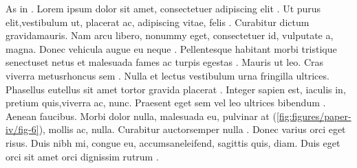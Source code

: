 \begin{sloppypar} %

As in . Lorem  ipsum dolor sit amet, consectetuer adipiscing elit \cite{LIUDIMULYO201767}. Ut purus  elit,vestibulum ut, placerat ac, adipiscing vitae, felis . Curabitur dictum  gravidamauris. Nam arcu libero, nonummy eget, consectetuer id, vulputate a, magna. Donec vehicula augue eu neque \cite{liudimulyo_2018}. Pellentesque habitant morbi tristique senectuset netus et malesuada fames ac turpis egestas . Mauris ut leo. Cras viverra metusrhoncus sem \cite{2019liudimulyo}. Nulla et lectus vestibulum urna fringilla ultrices. Phasellus eutellus sit amet tortor gravida placerat . Integer sapien est, iaculis in, pretium quis,viverra ac, nunc. Praesent eget sem vel leo ultrices bibendum \cite{liudimulyo2020853}. Aenean faucibus. Morbi dolor nulla, malesuada eu, pulvinar at (\ref{fig:figures/paper-iv/fig-6}), mollis ac, nulla. Curabitur auctorsemper nulla . Donec varius orci eget risus. Duis nibh mi, congue eu, accumsaneleifend, sagittis quis, diam. Duis eget orci sit amet orci dignissim rutrum \cite{LIUDIMULYO201767,liudimulyo_2018,2019liudimulyo,liudimulyo2020853,liudimulyo_unpublished1,liudimulyo_unpublished2}.

\end{sloppypar}

